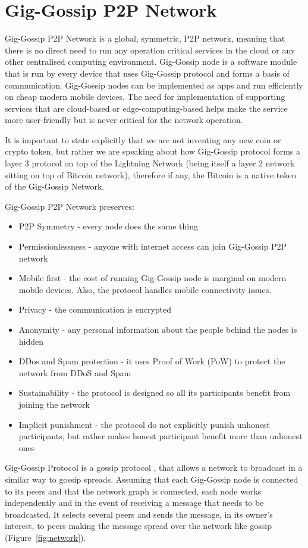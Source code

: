 \documentclass{article}
\begin{document}
\section{Gig-Gossip P2P Network}
Gig-Gossip P2P Network is a global, symmetric, P2P network, meaning that there is no direct need to run any operation critical services in the cloud or any other centralised computing environment. Gig-Gossip node is a software module that is run by every device that uses Gig-Gossip protocol and forms a basis of communication. Gig-Gossip nodes can be implemented as apps and run efficiently on cheap modern mobile devices. The need for implementation of supporting services that are cloud-based or edge-computing-based helps make the service more user-friendly but is never critical for the network operation.

It is important to state explicitly that we are not inventing any new coin or crypto token, but rather we are speaking about how Gig-Gossip protocol forms a layer 3 protocol on top of the Lightning Network (being itself a layer 2 network sitting on top of Bitcoin network), therefore if any, the Bitcoin is a native token of the Gig-Gossip Network.

Gig-Gossip P2P Network preserves:
\begin{itemize}
\item P2P Symmetry - every node does the same thing
\item Permissionlessness - anyone with internet access can join Gig-Gossip P2P network
\item Mobile first - the cost of running Gig-Gossip node is marginal on modern mobile devices. Also, the protocol handles mobile connectivity issues.
\item Privacy - the communication is encrypted
\item Anonymity - any personal information about the people behind the nodes is hidden
\item DDos and Spam protection - it uses Proof of Work (PoW) to protect the network from DDoS and Spam
\item Sustainability - the protocol is designed so all its participants benefit from joining the network
\item Implicit punishment - the protocol do not explicitly punish unhonest participants, but rather makes honest participant benefit more than unhonest ones
\end{itemize}

Gig-Gossip Protocol is a gossip protocol \cite{Fanout}, that allows a network to broadcast in a similar way to gossip spreads. Assuming that each Gig-Gossip node is connected to its peers and that the network graph is connected, each node works independently and in the event of receiving a message that needs to be broadcasted. It selects several peers and sends the message, in its owner's interest, to peers making the message spread over the network like gossip (Figure~\ref{fig:network}). 
\end{document}

